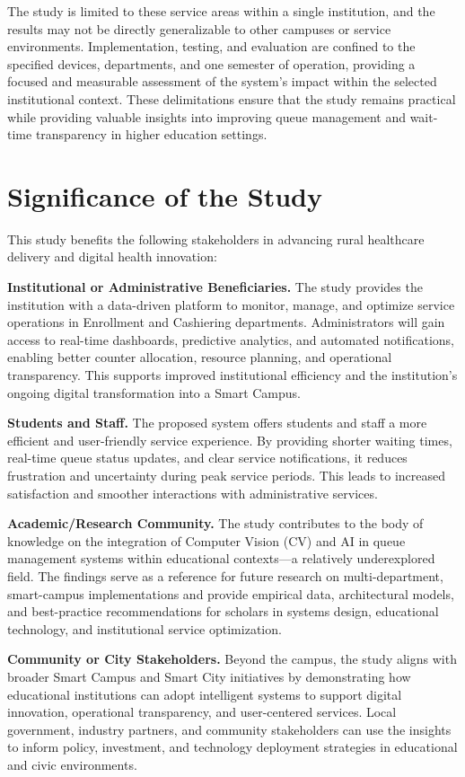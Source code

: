 \documentclass{research}
\begin{document}
The study is limited to these service areas within a single institution, and the results may not be directly generalizable to other campuses or service environments. Implementation, testing, and evaluation are confined to the specified devices, departments, and one semester of operation, providing a focused and measurable assessment of the system's impact within the selected institutional context. These delimitations ensure that the study remains practical while providing valuable insights into improving queue management and wait-time transparency in higher education settings.

\section{Significance of the Study}

This study benefits the following stakeholders in advancing rural healthcare delivery and digital health innovation:

\textbf {Institutional or Administrative Beneficiaries.} The study provides the institution with a data-driven platform to monitor, manage, and optimize service operations in Enrollment and Cashiering departments. Administrators will gain access to real-time dashboards, predictive analytics, and automated notifications, enabling better counter allocation, resource planning, and operational transparency. This supports improved institutional efficiency and the institution's ongoing digital transformation into a Smart Campus.

\textbf {Students and Staff.} The proposed system offers students and staff a more efficient and user-friendly service experience. By providing shorter waiting times, real-time queue status updates, and clear service notifications, it reduces frustration and uncertainty during peak service periods. This leads to increased satisfaction and smoother interactions with administrative services.

\textbf {Academic/Research Community.} The study contributes to the body of knowledge on the integration of Computer Vision (CV) and AI in queue management systems within educational contexts—a relatively underexplored field. The findings serve as a reference for future research on multi-department, smart-campus implementations and provide empirical data, architectural models, and best-practice recommendations for scholars in systems design, educational technology, and institutional service optimization.

\textbf {Community or City Stakeholders.} Beyond the campus, the study aligns with broader Smart Campus and Smart City initiatives by demonstrating how educational institutions can adopt intelligent systems to support digital innovation, operational transparency, and user-centered services. Local government, industry partners, and community stakeholders can use the insights to inform policy, investment, and technology deployment strategies in educational and civic environments.
\end{document}

